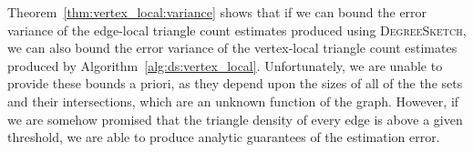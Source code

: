 \documentclass{vldb}
\newcommand{\algoname}[1]{\textnormal{\textsc{#1}}}
\begin{document}
\begin{appendix}
Theorem~\ref{thm:vertex_local:variance} shows that if we can bound the error variance of the edge-local triangle count estimates produced using \algoname{DegreeSketch}, we can also bound the error variance of the vertex-local triangle count estimates produced by Algorithm~\ref{alg:ds:vertex_local}. 
Unfortunately, we are unable to provide these bounds a priori, as they depend upon the sizes of all of the the sets and their intersections, which are an unknown function of the graph. 
However, if we are somehow promised that the triangle density of every edge is above a given threshold, we are able to produce analytic guarantees of the estimation error.

%



\end{appendix}
\end{document}
